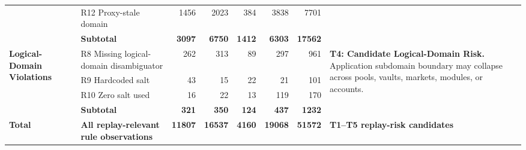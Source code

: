\begin{table}[t]
\begin{tabular}{p{2.35cm}p{2.8cm}rrrrrp{4.25cm}}
 & R12 Proxy-stale domain & 1456 & 2023 & 384 & 3838 & 7701 &  \\
 & \textbf{Subtotal} & \textbf{3097} & \textbf{6750} & \textbf{1412} & \textbf{6303} & \textbf{17562} & \\
\midrule
\multirow{4}{*}{\textbf{Logical-Domain Violations}} & R8 Missing logical-domain disambiguator & 262 & 313 & 89 & 297 & 961 & \multirow{4}{4.25cm}{\textbf{T4: Candidate Logical-Domain Risk.} Application subdomain boundary may collapse across pools, vaults, markets, modules, or accounts.} \\
 & R9 Hardcoded salt & 43 & 15 & 22 & 21 & 101 &  \\
 & R10 Zero salt used & 16 & 22 & 13 & 119 & 170 &  \\
 & \textbf{Subtotal} & \textbf{321} & \textbf{350} & \textbf{124} & \textbf{437} & \textbf{1232} & \\
\midrule
\textbf{Total} & \textbf{All replay-relevant rule observations} & \textbf{11807} & \textbf{16537} & \textbf{4160} & \textbf{19068} & \textbf{51572} & \textbf{T1--T5 replay-risk candidates} \\
\bottomrule
\end{tabular}
\end{table}
